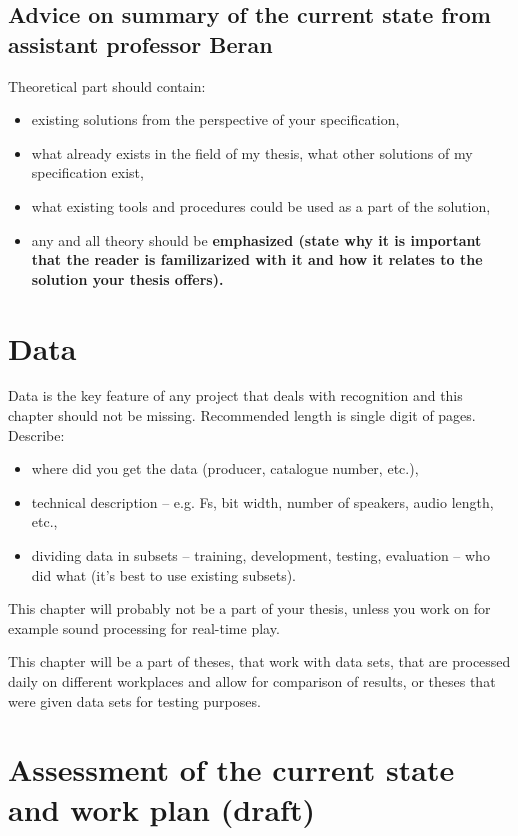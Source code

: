 {{\subsection*{Advice on summary of the current state from assistant professor Beran}

Theoretical part should contain:
\begin{itemize}
  \item{existing solutions from the perspective of your specification,}
  \item{what already exists in the field of my thesis, what other solutions of my specification exist,}
  \item{what existing tools and procedures could be used as a part of the solution,}
  \item{any and all theory should be \bf emphasized \rm (state why it is important that the reader is familizarized with it and how it relates to the solution your thesis offers).}
\end{itemize}

\section{Data}

Data is the key feature of any project that deals with recognition and this chapter should not be missing. Recommended length is single digit of pages. Describe:
\begin{itemize}
  \item{where did you get the data (producer, catalogue number, etc.),}
  \item{technical description -- e.g. Fs, bit width, number of speakers, audio length, etc.,}
  \item{dividing data in subsets -- training, development, testing, evaluation -- who did what (it's best to use existing subsets).}
\end{itemize}

This chapter will probably not be a part of your thesis, unless you work on for example sound processing for real-time play.

This chapter will be a part of theses, that work with data sets, that are processed daily on different workplaces and allow for comparison of results, or theses that were given data sets for testing purposes.


\section{Assessment of the current state and work plan (draft)}
\label{navrh}

}}

